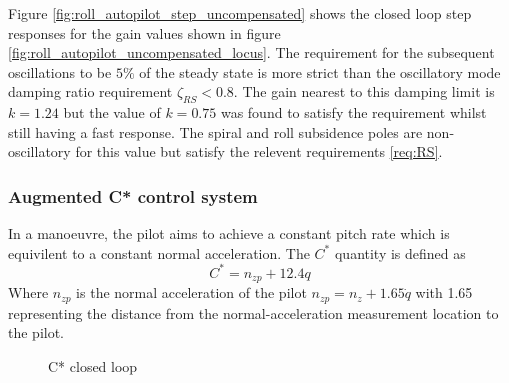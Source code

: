 \documentclass{article}
\begin{document}
Figure \ref{fig:roll_autopilot_step_uncompensated} shows the closed loop step responses for the gain values shown in figure \ref{fig:roll_autopilot_uncompensated_locus}.
The requirement for the subsequent oscillations to be $5 \%$ of the steady state is more strict than the oscillatory mode damping ratio requirement $\zeta_{RS}<0.8$.
The gain nearest to this damping limit is $k=1.24$ but the value of $k=0.75$ was found to satisfy the requirement whilst still having a fast response.
The spiral and roll subsidence poles are non-oscillatory for this value but satisfy the relevent requirements \ref{req:RS}.


\subsubsection{Augmented C* control system}

In a manoeuvre, the pilot aims to achieve a constant pitch rate which is equivilent to a constant normal acceleration.
The $C^*$ quantity is defined as
\begin{equation}
    C^* = n_{zp} + 12.4q
\end{equation}
Where $n_{zp}$ is the normal acceleration of the pilot $n_{zp} = n_z + 1.65 \dot{q}$ with 1.65 representing the distance from the normal-acceleration measurement location to the pilot.


\begin{figure}[H]
    \begin{center}
    \end{center}
    \caption{C* closed loop}
    \label{fig:cstar_diagram}
\end{figure}
\end{document}
